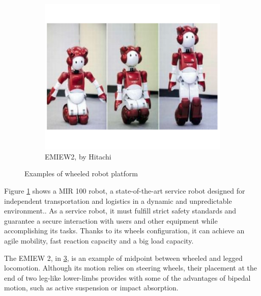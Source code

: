 \begin{figure}[h]
\begin{subfigure}[b]{0.32\textwidth}
        \label{fig:mobile_mir}
    \end{subfigure}
    \centering
    \begin{subfigure}[b]{0.32\textwidth}
        \includegraphics[width=\textwidth]{figures/mobile_hitachi.pdf}
        \caption{EMIEW2, by Hitachi}
        \label{fig:mobile_hitachi}
    \end{subfigure}
\caption{Examples of wheeled robot platform}
\end{figure}

Figure \ref{fig:mobile_mir} shows a MIR 100 robot, a state-of-the-art service robot designed for independent transportation and logistics in a dynamic and unpredictable environment..
As a service robot, it must fulfill strict safety standards and guarantee a secure interaction with users and other equipment while accomplishing its tasks.
Thanks to its wheels configuration, it can achieve an agile mobility, fast reaction capacity and a big load capacity.

The EMIEW 2, in \ref{fig:mobile_hitachi}, is an example of midpoint between wheeled and legged locomotion.
Although its motion relies on steering wheels, their placement at the end of two leg-like lower-limbs provides with some of the advantages of bipedal motion, such as active suspension or impact absorption.



